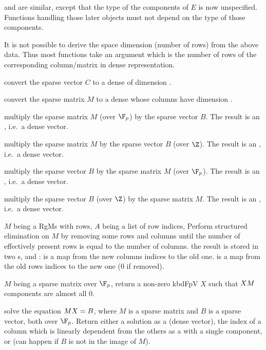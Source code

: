 and  are similar, except that the type of the components
of $E$ is now unspecified. Functions handling those later objects
must not depend on the type of those components.

It is not possible to derive the space dimension (number of rows) from the
above data. Thus most functions take an argument  which is the
number of rows of the corresponding column/matrix in dense representation.

 convert the sparse vector $C$
to a dense  of dimension .

 convert the sparse matrix $M$
to a dense  whose columns have dimension .

 multiply the sparse matrix $M$
(over $\F_p$) by the sparse vector $B$. The result is an , i.e.~a
dense vector.

 multiply the sparse matrix $M$
by the sparse vector $B$ (over $\Z$). The result is an , i.e.~a
dense vector.

 multiply the sparse vector $B$
by the sparse matrix $M$ (over $\F_p$). The result is an , i.e.~a
dense vector.

 multiply the sparse vector $B$ (over
$\Z$) by the sparse matrix $M$. The result is an , i.e.~a
dense vector.

$M$ being a RgMs with  rows, $A$ being a list of row indices,
Perform structured elimination on $M$ by removing some rows and columns until
the number of effectively present rows is equal to the number of columns.
the result is stored in two s,  and :
 is a map from the new columns indices to the old one.
 is a map from the old rows indices to the new one ($0$ if removed).

$M$ being a sparse matrix over $\F_p$, return a non-zero kbd{FpV} $X$ such
that $X\*M$ components are almost all $0$.

solve the equation $M\*X = B$, where $M$ is a sparse matrix and $B$ is a sparse
vector, both over $\F_p$. Return either a solution as a  (dense
vector), the index of a column which is linearly dependent from the
others as a  with a single component, or 
(can happen if $B$ is not in the image of $M$).


